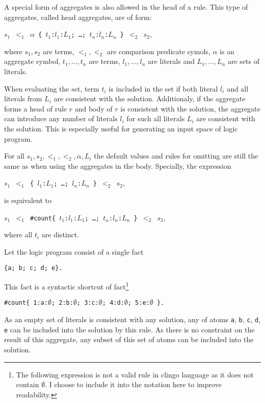 A special form of aggregates is also allowed in the head of a rule.
This type of aggregates, called head aggregates, are of form:
\begin{center}
    \texttt{$s_1$ $<_1$ $\alpha$ \{ $t_1$:$l_1$:$L_1$; \ldots; $t_n$:$l_n$:$L_n$ \} $<_2$ $s_2$},  %
\end{center}
where $s_1, s_2$ are terms, $<_1, <_2$ are comparison predicate symols,
$\alpha$ is an aggregate symbol,
$t_1, \ldots, t_n$ are terms, $l_1, \ldots, l_n$ are literals
and $L_1, \ldots, L_n$ are sets of literals.

When evaluating the set, term $t_i$ is included in the set if both literal $l_i$
and all literals from $L_i$ are consistent with the solution.
Additionaly, if the aggregate forms a head of rule $r$ and body of $r$ is consistent
with the solution, the aggregate can introduce any number of literals $l_i$
for such all literals $L_i$ are consistent with the solution.
This is especially useful for generating an input space of logic program.

For all $s_1, s_2, <_1, <_2, \alpha, L_i$ the default values and rules for omitting
are still the same as when using the aggregates in the body.
Specially, the expression
\begin{center}
    \texttt{$s_1$ $<_1$ \{ $l_1$:$L_1$; \ldots; $l_n$:$L_n$ \} $<_2$ $s_2$},  %
\end{center}
is equivalent to
\begin{center}
    \texttt{$s_1$ $<_1$ \#count\{ $t_1$:$l_1$:$L_1$; \ldots; $t_n$:$l_n$:$L_n$ \} $<_2$ $s_2$},  %
\end{center}
where all $t_i$ are distinct.

\begin{example}\label{exp:input_space}
    Let the logic program consist of a single fact
    \begin{center}
        \texttt{\{a; b; c; d; e\}.}
    \end{center}
    This fact is a syntactic shortcut of fact\footnote{
        The following expression is not a valid rule in clingo language
        as it does not contain $\emptyset$. I choose to include it into the
        notation here to improve readability.
    }
    \begin{center}
        \texttt{\#count\{ 1:a:$\emptyset$; 2:b:$\emptyset$; 3:c:$\emptyset$; 4:d:$\emptyset$; 5:e:$\emptyset$ \}.}  %
    \end{center}
    As an empty set of literals is consistent with any solution, any of atoms
    \texttt{a}, \texttt{b}, \texttt{c}, \texttt{d}, \texttt{e}
    can be included into the solution by this rule. As there is no constraint on the
    result of this aggregate, any subset of this set of atoms can be included into
    the solution.
\end{example}

